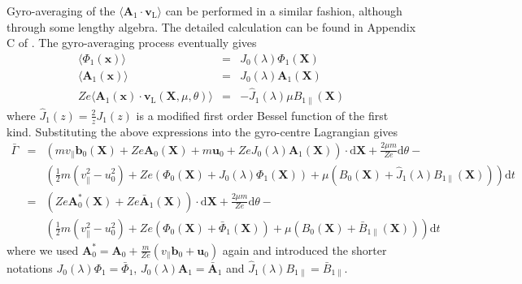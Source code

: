 \documentclass[a4paper,10pt]{article}
\newcommand{\st}[1]{\mathrm{#1}} %
\renewcommand{\vec}[1]{\mathbf{#1}}
\begin{document}
Gyro-averaging of the $\langle \vec{A}_1 \cdot \vec{v}_{\st{L}} \rangle$ can be performed in a similar fashion, although through some lengthy algebra. The detailed calculation can be found in Appendix C of \cite{dannert}. The gyro-averaging process eventually gives
\begin{eqnarray*}
	\langle \Phi_1(\mathbf{x})\rangle &=& J_0(\lambda) \Phi_1(\mathbf{X}) \\
	\langle \mathbf{A}_1(\mathbf{x})\rangle &=& J_0(\lambda) \mathbf{A}_1(\mathbf{X}) \\
	Z e \langle \mathbf{A}_1(\mathbf{x}) \cdot \vec{v}_{\st{L}}(\mathbf{X},\mu,\theta) \rangle &=& - \hat{J}_1(\lambda) \mu B_{1 \parallel}(\mathbf{X})
\end{eqnarray*}
where $\hat{J}_1(z) = \frac{2}{z} J_1(z)$ is a modified first order Bessel function of the first kind.
Substituting the above expressions into the gyro-centre Lagrangian gives
\begin{eqnarray}
	\bar{\Gamma} &=& \left( m v_{\parallel} \mathbf{b}_0(\mathbf{X}) + Z e \mathbf{A}_0(\mathbf{X}) + m \vec{u}_0 + Z e J_0(\lambda) \mathbf{A}_1(\mathbf{X}) \right) \cdot \mathrm{d} \mathbf{X} + \frac{2 \mu m}{Z e} \mathrm{d} \theta - \nonumber\\
	&& \left( \frac{1}{2} m \left( v_{\parallel}^2 - u_0^2 \right) + Z e \left( \Phi_0(\vec{X}) + J_0(\lambda) \Phi_1(\mathbf{X}) \right) + \mu \left( B_0(\mathbf{X}) + \hat{J}_1(\lambda) B_{1 \parallel}(\mathbf{X}) \right) \right) \mathrm{d}t \nonumber \\
	&=& \left( Z e \mathbf{A}_0^{*}(\mathbf{X}) + Z e \bar{\mathbf{A}}_1(\mathbf{X}) \right) \cdot \mathrm{d} \mathbf{X} + \frac{2 \mu m}{Z e} \mathrm{d} \theta - \nonumber\\
	&& \left( \frac{1}{2} m \left( v_{\parallel}^2 - u_0^2 \right) + Z e \left( \Phi_0(\vec{X}) + \bar{\Phi}_1(\mathbf{X}) \right) + \mu \left( B_0(\mathbf{X}) + \bar{B}_{1 \parallel}(\mathbf{X}) \right) \right) \mathrm{d}t
	\label{eq:gyro_oneform}
\end{eqnarray} 
where we used $\mathbf{A}_0^{*} = \mathbf{A}_0 + \frac{m }{Z e} (v_{\parallel} \mathbf{b}_0 + \vec{u}_0 )$ again and introduced the shorter notations $J_0(\lambda) \Phi_1 = \bar{\Phi}_1$, $J_0(\lambda) \mathbf{A}_1 = \bar{\mathbf{A}}_1$ and $\hat{J}_1(\lambda) B_{1 \parallel} = \bar{B}_{1 \parallel}$.


\end{document}
